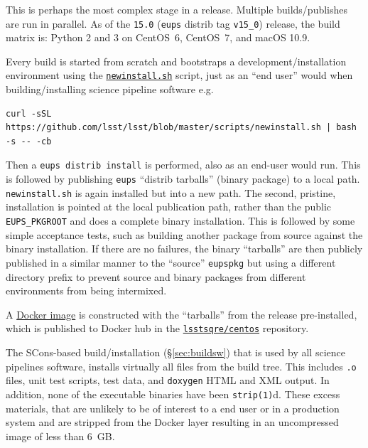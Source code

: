 This is perhaps the most complex stage in a release.  Multiple builds/publishes
are run in parallel.  As of the \texttt{15.0} (\texttt{eups} distrib tag
\texttt{v15\_0}) release, the build matrix is: Python 2 and 3 on CentOS~6, CentOS~7, and macOS 10.9.

\noindent Every build is started from scratch and bootstraps a development/installation environment using the \href{https://github.com/lsst/lsst/blob/master/scripts/newinstall.sh}{\texttt{new\-install.sh}}\cite{pipelines-guide} script, just as an ``end user'' would when building/installing science pipeline software e.g.

\begin{verbatim}
curl -sSL https://github.com/lsst/lsst/blob/master/scripts/newinstall.sh | bash -s -- -cb
\end{verbatim}

\noindent Then a \texttt{eups distrib install} is performed, also as an end-user would
run.  This is followed by publishing \texttt{eups} ``distrib tarballs'' (binary
package) to a local path.  \texttt{newinstall.sh} is again installed but into a
new path.  The second, pristine, installation is pointed at the local publication
path, rather than the public \texttt{EUPS\_PKGROOT} and does a complete binary
installation.  This is followed by some simple acceptance tests, such as
building another package from source against the binary installation.  If there
are no failures, the binary ``tarballs'' are then publicly published in a
similar manner to the ``source'' \texttt{eupspkg} but using a different
directory prefix to prevent source and binary packages from different
environments from being intermixed.

A \href{https://github.com/lsst-sqre/docker-tarballs}{Docker image} is
constructed with the ``tarballs'' from the release pre-installed, which is
published to Docker hub in the
\href{https://hub.docker.com/r/lsstsqre/centos/}{\texttt{lsstsqre/centos}} repository.

\noindent The SCons-based build/installation (\S\ref{sec:buildsw}) that is used by all science pipelines software, installs
virtually all files from the build tree. This includes \texttt{.o} files, unit
test scripts, test data, and \texttt{doxygen} HTML and XML output. In
addition, none of the executable binaries have been \texttt{strip(1)}d.  These
excess materials, that are unlikely to be of interest to a end user or in a
production system
and are stripped from the Docker layer resulting in an uncompressed image of less than 6~GB.

